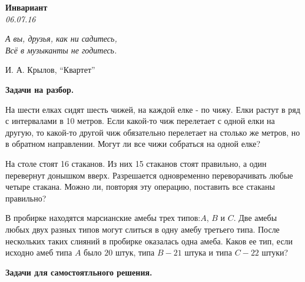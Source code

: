 \begin{center}
\textbf{\Large Инвариант}\\
\textit{06.07.16}
\end{center}

\epigraph{\it А вы, друзья, как ни садитесь,\\
Всё в музыканты не годитесь.}{И. А. Крылов, ``Квартет''}

{\bf Задачи на разбор.}
\begin{problems}
\item На шести елках сидят шесть чижей, на каждой елке - по чижу. Елки растут в ряд с интервалами в 10 метров. Если какой-то чиж перелетает с одной елки на другую, то какой-то другой чиж обязательно перелетает на столько же метров, но в обратном направлении. Могут ли все чижи собраться на одной елке? 

	
    
    \item На столе стоят 16 стаканов. Из них 15 стаканов стоят правильно, а один перевернут донышком вверх. Разрешается одновременно переворачивать любые четыре стакана. Можно ли, повторяя эту операцию, поставить все стаканы правильно?
        
    \item В пробирке находятся марсианские амебы трех типов:$A$, $B$ и $C$. Две амебы любых двух разных типов могут слиться в одну амебу третьего типа. После нескольких таких слияний в пробирке оказалась одна амеба. Каков ее тип, если исходно амеб типа $A$ было $20$ штук, типа $B - 21$ штука и типа $C - 22$ штуки?
\end{problems}
\resetproblem
{\bf Задачи для самостоятльного решения.}
